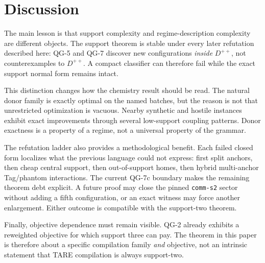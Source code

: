 \section{Discussion}

The main lesson is that support complexity and regime-description complexity are different objects. The support theorem is stable under every later refutation described here: QG-5 and QG-7 discover new configurations \emph{inside} $D^{++}$, not counterexamples to $D^{++}$. A compact classifier can therefore fail while the exact support normal form remains intact.

This distinction changes how the chemistry result should be read. The natural donor family is exactly optimal on the named batches, but the reason is not that unrestricted optimization is vacuous. Nearby synthetic and hostile instances exhibit exact improvements through several low-support coupling patterns. Donor exactness is a property of a regime, not a universal property of the grammar.

The refutation ladder also provides a methodological benefit. Each failed closed form localizes what the previous language could not express: first split anchors, then cheap central support, then out-of-support homes, then hybrid multi-anchor Tag/phantom interactions. The current QG-7c boundary makes the remaining theorem debt explicit. A future proof may close the pinned \texttt{comm-s2} sector without adding a fifth configuration, or an exact witness may force another enlargement. Either outcome is compatible with the support-two theorem.

Finally, objective dependence must remain visible. QG-2 already exhibits a reweighted objective for which support three can pay. The theorem in this paper is therefore about a specific compilation family \emph{and} objective, not an intrinsic statement that TARE compilation is always support-two.
